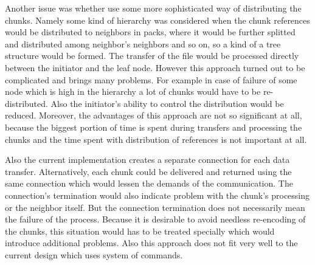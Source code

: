 Another issue was whether use some more sophisticated way of
distributing the chunks. Namely some kind of hierarchy was considered
when the chunk references would be distributed to neighbors in packs,
where it would be further splitted and distributed among neighbor's
neighbors and so on, so a kind of a tree structure would be formed. The
transfer of the file would be processed directly between the initiator
and the leaf node. However this approach turned out to be complicated
and brings many problems. For example in case of failure of some node
which is high in the hierarchy a lot of chunks would have to be
re-distributed. Also the initiator's ability to control the distribution
would be reduced. Moreover, the advantages of this approach are not so
significant at all, because the biggest portion of time is spent during
transfers and processing the chunks and the time spent with distribution
of references is not important at all.

Also the current implementation creates a separate connection for each
data transfer. Alternatively, each chunk could be delivered and returned
using the same connection which would lessen the demands of the
communication. The connection's termination would also indicate problem
with the chunk's processing or the neighbor itself. But the connection
termination does not necessarily mean the failure of the process.
Because it is desirable to avoid needless re-encoding of the chunks,
this situation would has to be treated specially which would introduce
additional problems. Also this approach does not fit very well to the
current design which uses system of commands.
